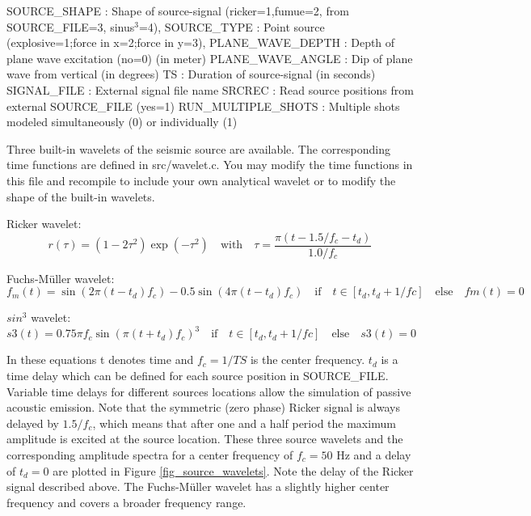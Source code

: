 \documentclass[11pt,onecolumn,oneside]{article}
\begin{document}
SOURCE\_SHAPE : Shape of source-signal (ricker=1,fumue=2, from SOURCE\_FILE=3, sinus$^3$=4),  \newline
SOURCE\_TYPE : Point source (explosive=1;force in x=2;force in y=3),\newline
PLANE\_WAVE\_DEPTH : Depth of plane wave excitation (no=0) (in meter)\newline
PLANE\_WAVE\_ANGLE : Dip of plane wave from vertical (in degrees)\newline
TS : Duration of source-signal (in seconds)\newline
SIGNAL\_FILE : External signal file name \newline
SRCREC : Read source positions from external SOURCE\_FILE (yes=1)\newline
RUN\_MULTIPLE\_SHOTS : Multiple shots modeled simultaneously (0) or individually (1)\newline

Three built-in wavelets of the seismic source are available. The corresponding time functions are defined in src/wavelet.c. You may modify the time functions in this file and recompile to include your own analytical wavelet or to modify the shape of the built-in wavelets.

Ricker wavelet:
\begin{equation}
r(\tau)=\left(1-2\tau^2\right)\exp(- \tau^2) \quad \mbox{with} \quad \tau=\frac{\pi(t-1.5/f_c-t_d)}{1.0/f_c} 
\label{eq_ricker}
\end{equation}


Fuchs-M\"uller wavelet:
\begin{equation}
f_m(t)=\sin(2\pi(t-t_d)f_c)-0.5\sin(4\pi(t-t_d)f_c) \quad \mbox{if} \quad t\in[t_d,t_d+1/fc] \quad \mbox{else} \quad fm(t)=0
\label{eq_fm}
\end{equation}

$sin^3$ wavelet:
\begin{equation}
s3(t)=0.75 \pi f_c \sin(\pi(t+t_d)f_c)^3\quad \mbox{if} \quad t \in[t_d,t_d+1/fc] \quad \mbox{else} \quad s3(t)=0
\label{eq_s3}
\end{equation}

In these equations t denotes time and $f_c=1/TS$ is the center frequency. $t_d$ is a time delay which can be defined for each source position in SOURCE\_FILE. Variable time delays for different sources locations allow the simulation of passive acoustic emission. Note that the symmetric (zero phase) Ricker signal is always delayed by $1.5/f_c$, which means that after one and a half period the maximum amplitude is excited at the source location. These three source wavelets and the corresponding amplitude spectra for a center frequency of $f_c=50$ Hz and a delay of $t_d=0$ are plotted in Figure \ref{fig_source_wavelets}. Note the delay of the Ricker signal described above. The  Fuchs-M\"uller wavelet has a slightly higher center frequency and covers a broader frequency range.
\end{document}
